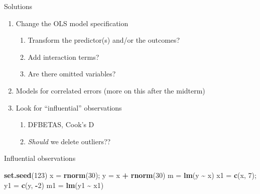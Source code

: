 \documentclass[
  ignorenonframetext,
]{beamer}
\newenvironment{Shaded}{\begin{snugshade}}{\end{snugshade}}
\newcommand{\DecValTok}[1]{\textcolor[rgb]{0.00,0.00,0.81}{#1}}
\newcommand{\FunctionTok}[1]{\textcolor[rgb]{0.13,0.29,0.53}{\textbf{#1}}}
\newcommand{\NormalTok}[1]{#1}
\newcommand{\OtherTok}[1]{\textcolor[rgb]{0.56,0.35,0.01}{#1}}
\newcommand{\SpecialCharTok}[1]{\textcolor[rgb]{0.81,0.36,0.00}{\textbf{#1}}}
\providecommand{\tightlist}{%
  \setlength{\itemsep}{0pt}\setlength{\parskip}{0pt}}
\newcommand{\setsep}{\setlength{\itemsep}{3pt}}
\newcommand{\setskip}{\setlength{\parskip}{3pt}}
\renewcommand{\tightlist}{\setsep\setskip}
\begin{document}
\begin{frame}{Solutions}
\label{solutions}
\pause

\begin{enumerate}[<+->]
\tightlist
\item
  Change the OLS model specification

  \begin{enumerate}[<+->]
  [a.]
  \tightlist
  \item
    Transform the predictor(s) and/or the outcomes?
  \item
    Add interaction terms?
  \item
    Are there omitted variables?
  \end{enumerate}
\item
  Models for correlated errors (more on this after the midterm)
\item
  Look for ``influential'' observations

  \begin{enumerate}[<+->]
  [a.]
  \tightlist
  \item
    DFBETAS, Cook's D
  \item
    \emph{Should} we delete outliers??
  \end{enumerate}
\end{enumerate}
\end{frame}

\begin{frame}[fragile]{Influential observations}
\label{influential-observations}
\pause

\begin{Shaded}
\begin{Highlighting}[]
\FunctionTok{set.seed}\NormalTok{(}\DecValTok{123}\NormalTok{)}
\NormalTok{x }\OtherTok{=} \FunctionTok{rnorm}\NormalTok{(}\DecValTok{30}\NormalTok{); y }\OtherTok{=}\NormalTok{ x }\SpecialCharTok{+} \FunctionTok{rnorm}\NormalTok{(}\DecValTok{30}\NormalTok{)}
\NormalTok{m }\OtherTok{=} \FunctionTok{lm}\NormalTok{(y }\SpecialCharTok{\textasciitilde{}}\NormalTok{ x)}
\NormalTok{x1 }\OtherTok{=} \FunctionTok{c}\NormalTok{(x, }\DecValTok{7}\NormalTok{); y1 }\OtherTok{=} \FunctionTok{c}\NormalTok{(y, }\SpecialCharTok{{-}}\DecValTok{2}\NormalTok{)}
\NormalTok{m1 }\OtherTok{=} \FunctionTok{lm}\NormalTok{(y1 }\SpecialCharTok{\textasciitilde{}}\NormalTok{ x1)}
\end{Highlighting}
\end{Shaded}
\end{frame}
\end{document}
